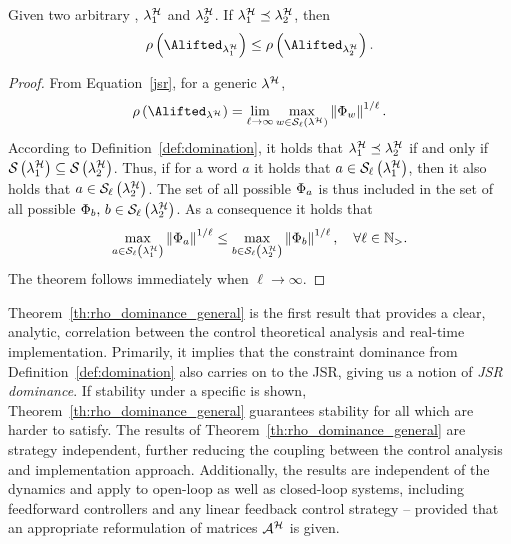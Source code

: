 \begin{theorem}%
    \label{th:rho_dominance_general}%
    Given two arbitrary \ewhc{}, $\lambda_1^{\mathcal{H}}$ and $\lambda_2^{\mathcal{H}}$.
    If $\lambda_1^{\mathcal{H}} \preceq \lambda_2^{\mathcal{H}}$, then
    \begin{equation*}
        \rho\funof{\Alifted_{\lambda_1^\strat}} \leq \rho\funof{\Alifted_{\lambda_2^\strat}}.
    \end{equation*}

    \begin{proof}
        From Equation~\eqref{jsr}, for a generic \ewhc{} $\lambda^{\mathcal{H}}$,
        \begin{equation*}
            \rho\funof{\Alifted_{\lambda^\strat}} = \lim_{\ell\rightarrow \infty} \max_{w \in \sset{\ell}{\lambda^\strat}}\norm{\clmat{}_{w}}^{1/\ell}.
        \end{equation*}
        According to Definition~\ref{def:domination}, it holds that $\lambda^{\mathcal{H}}_1 \preceq \lambda^{\mathcal{H}}_2$ if and only if $\mathcal{S}_{}\left( \lambda^{\mathcal{H}}_1 \right) \subseteq \mathcal{S}_{}\left( \lambda^{\mathcal{H}}_2 \right)$.
        Thus, if for a word $a$ it holds that $a \in \mathcal{S}_{\ell}\left( \lambda^{\mathcal{H}}_1 \right)$, then it also holds that $a \in \mathcal{S}_{\ell}\left( \lambda^{\mathcal{H}}_2 \right)$.
        The set of all possible $\Phi{}_{a}$ is thus included in the set of all possible $\Phi{}_{b},\, b \in \mathcal{S}_{\ell}\left( \lambda^{\mathcal{H}}_2 \right)$.
        As a consequence it holds that
        \begin{equation*}
            \max_{a \in \mathcal{S}_{\ell}\left( \lambda^{\mathcal{H}}_1 \right)}\left\lVert\Phi{}_{a}\right\rVert^{1/\ell} \leq
            \max_{b \in \mathcal{S}_{\ell}\left( \lambda^{\mathcal{H}}_2 \right)}\left\lVert\Phi{}_{b}\right\rVert^{1/\ell}, \quad
            \forall \ell\in\mathbb{N}_{>}.
        \end{equation*}
        The theorem follows immediately when $\ell\rightarrow \infty$.
    \end{proof}
\end{theorem}

Theorem~\ref{th:rho_dominance_general} is the first result that provides a clear, analytic, correlation between the control theoretical analysis and real-time implementation.
Primarily, it implies that the constraint dominance from Definition~\ref{def:domination} also carries on to the JSR, giving us a notion of \emph{JSR dominance}.
If stability under a specific \ewhc{} is shown, Theorem~\ref{th:rho_dominance_general} guarantees stability for all \ewhc{} which are harder to satisfy.
The results of Theorem~\ref{th:rho_dominance_general} are strategy independent, further reducing the coupling between the control analysis and implementation approach.
Additionally, the results are independent of the dynamics and apply to open-loop as well as closed-loop systems, including feedforward controllers and any linear feedback control strategy -- provided that an appropriate reformulation of matrices $\mathcal{A}^{\mathcal{H}}$ is given.

